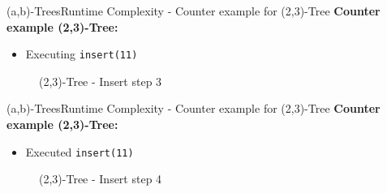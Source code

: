 
\begin{frame}{(a,b)-Trees}{Runtime Complexity - Counter example for (2,3)-Tree}
  \textbf{Counter example (2,3)-Tree:}
  \begin{itemize}
    \item
      Executing \texttt{\color{MainA}insert(11)}
  \end{itemize}
  \begin{figure}
    \begin{adjustbox}{width=0.7\linewidth}
      
    \end{adjustbox}
    \label{fig:a_b_tree:2_3_tree_8}
    \caption{(2,3)-Tree - Insert step 3}
  \end{figure}
\end{frame}


\begin{frame}{(a,b)-Trees}{Runtime Complexity - Counter example for (2,3)-Tree}
  \textbf{Counter example (2,3)-Tree:}
  \begin{itemize}
    \item
      Executed \texttt{\color{MainA}insert(11)}
  \end{itemize}
  \begin{figure}
    \begin{adjustbox}{width=0.6\linewidth}
      
    \end{adjustbox}
    \label{fig:a_b_tree:2_3_tree_9}
    \caption{(2,3)-Tree - Insert step 4}
  \end{figure}
\end{frame}


